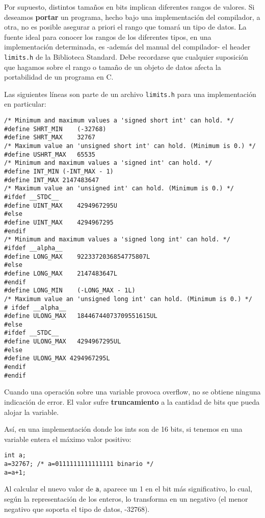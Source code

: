 Por supuesto, distintos tamaños en bits implican diferentes rangos de valores. Si deseamos \textbf{portar} un
programa, hecho bajo una implementación del compilador, a otra, no es posible asegurar a priori el
rango que tomará un tipo de datos. La fuente ideal para conocer los rangos de los diferentes tipos, en
una implementación determinada, es -además del manual del compilador- el header \texttt{limits.h} de la
Biblioteca Standard. Debe recordarse que cualquier suposición que hagamos sobre el rango o tamaño
de un objeto de datos afecta la portabilidad de un programa en C.

Las siguientes líneas son parte de un archivo \texttt{limits.h} para una implementación en particular:

\begin{lstlisting}
/* Minimum and maximum values a 'signed short int' can hold. */
#define SHRT_MIN	(-32768)
#define SHRT_MAX	32767
/* Maximum value an 'unsigned short int' can hold. (Minimum is 0.) */
#define USHRT_MAX	65535
/* Minimum and maximum values a 'signed int' can hold. */
#define INT_MIN	(-INT_MAX - 1)
#define INT_MAX	2147483647
/* Maximum value an 'unsigned int' can hold. (Minimum is 0.) */
#ifdef __STDC__
#define UINT_MAX 	4294967295U
#else
#define UINT_MAX  	4294967295
#endif
/* Minimum and maximum values a 'signed long int' can hold. */
#ifdef __alpha__
#define LONG_MAX 	9223372036854775807L
#else
#define LONG_MAX	2147483647L
#endif
#define LONG_MIN 	(-LONG_MAX - 1L)
/* Maximum value an 'unsigned long int' can hold. (Minimum is 0.) */
# ifdef __alpha__
#define ULONG_MAX	18446744073709551615UL
#else
#ifdef __STDC__
#define ULONG_MAX 	4294967295UL
#else
#define ULONG_MAX 4294967295L
#endif
#endif
\end{lstlisting}

Cuando una operación sobre una variable provoca overflow, no se obtiene ninguna indicación de error.
El valor sufre \textbf{truncamiento} a la cantidad de bits que pueda alojar la variable.

Así, en una implementación donde los ints son de 16 bits, si tenemos en una variable entera el máximo
valor positivo:

\begin{lstlisting}
int a; 
a=32767; /* a=0111111111111111 binario */
a=a+1;
\end{lstlisting}

Al calcular el nuevo valor de \texttt{a}, aparece un 1 en el bit más significativo, lo cual, según la representación de los enteros, lo transforma en un negativo (el menor negativo que soporta el tipo de datos, -32768).

